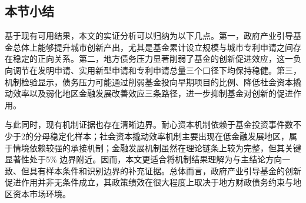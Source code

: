 \subsection{本节小结}

基于现有可用结果，本文的实证分析可以归纳为以下几点。第一，政府产业引导基金总体上能够提升城市创新产出，尤其是基金累计设立规模与城市专利申请之间存在稳定的正向关系。第二，地方债务压力显著削弱了基金的创新促进效应，这一负向调节在发明申请、实用新型申请和专利申请总量三个口径下均保持稳健。第三，机制检验显示，债务压力可能通过削弱基金投向早期项目的比例、降低社会资本撬动效率以及弱化地区金融发展改善效应三条路径，进一步抑制基金对创新的促进作用。

与此同时，现有机制证据也存在清晰边界。耐心资本机制依赖于基金投资事件数不少于2的分母稳定化样本；社会资本撬动效率机制主要出现在低金融发展地区，属于情境依赖较强的承接机制；金融发展机制虽然在理论链条上较为完整，但其关键显著性处于5\% 边界附近。因而，本文更适合将机制结果理解为与主结论方向一致、但具有样本条件和识别边界的补充证据。总体而言，政府产业引导基金的创新促进作用并非无条件成立，其政策绩效在很大程度上取决于地方财政债务约束与地区资本市场环境。
